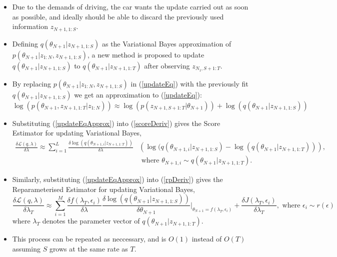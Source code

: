 \documentclass[12pt,a4paper]{article}\usepackage[]{graphicx}\usepackage[]{color}
\begin{document}
\begin{itemize}
\item Due to the demands of driving, the car wants the update carried out as soon as possible, and ideally should be able to discard the previously used information $z_{N+1, 1:S}$. 
\item Defining $q(\theta_{N+1} | z_{N+1, 1:S})$ as the Variational Bayes approximation of $p(\theta_{N+1} | z_{1:N}, z_{N+1, 1:S})$, a new method is proposed to update $q(\theta_{N+1} | z_{N+1, 1:S})$ to $q(\theta_{N+1} | z_{N+1, 1:T})$ after observing $z_{N_1, S+1:T}$.
\item By replacing $p(\theta_{N+1} | z_{1:N}, z_{N+1, 1:S})$ in (\ref{updateEq}) with the previously fit $q(\theta_{N+1} | z_{N+1, 1:S})$ we get an approximation to (\ref{updateEq}):
\begin{equation}
\label{updateEqApprox}
\log(p(\theta_{N+1}, z_{N+1, 1:T} | z_{1:N})) \approx \log(p(z_{N+1, S+1:T} | \theta_{N+1})) + \log(q(\theta_{N+1} | z_{N+1, 1:S}))
\end{equation}
\item Substituting (\ref{updateEqApprox}) into (\ref{scoreDeriv}) gives the Score Estimator for updating Variational Bayes, 
\begin{align}
\label{scoreUpdate}
\frac{\delta\mathcal{L}(q, \lambda)}{\delta \lambda} \approx \sum_{i = 1}^L \frac{\delta \log(q(\theta_{N+1, i} | z_{N+1, 1:T}))}{\delta \lambda} &\left(\log(q(\theta_{N+1, i} | z_{N+1, 1:S}) - \log(q(\theta_{N+1} | z_{N+1, 1:T})) \right), \nonumber \\
& \mbox{ where } \theta_{N+1, i} \sim q(\theta_{N+1} | z_{N+1, 1:T}).
\end{align}
\item Similarly, substituting (\ref{updateEqApprox}) into (\ref{rpDeriv}) gives the Reparameterised Estimator for updating Variational Bayes,
\begin{equation}
\label{rpUpdate}
\frac{\delta\mathcal{L}(q, \lambda)}{\delta \lambda_T} \approx \sum_{i = 1}^M \frac{\delta f(\lambda_T, \epsilon_i)}{\delta \lambda} \frac{\delta \log(q(\theta_{N+1} | z_{N+1, 1:S}))}{\delta \theta_{N+1}} \bigg\rvert_{\theta_{N+1} = f(\lambda_T, \epsilon_i)} + \frac{\delta J(\lambda_T, \epsilon_i)}{\delta \lambda_T}, \mbox{ where } \epsilon_i \sim r(\epsilon)
\end{equation}
where $\lambda_T$ denotes the parameter vector of $q(\theta_{N+1} | z_{N+1, 1:T})$.
\item This process can be repeated as neccessary, and is $O(1)$ instead of $O(T)$ assuming $S$ grows at the same rate as $T$.
\end{itemize}
\end{document}
